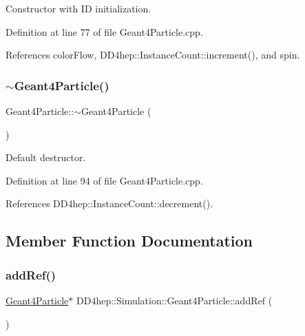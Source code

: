 Constructor with ID initialization. 



Definition at line 77 of file Geant4\+Particle.\+cpp.



References color\+Flow, D\+D4hep\+::\+Instance\+Count\+::increment(), and spin.

\hypertarget{class_d_d4hep_1_1_simulation_1_1_geant4_particle_a6826af4b7518aeb0e2396eb7abaed67c}{}\label{class_d_d4hep_1_1_simulation_1_1_geant4_particle_a6826af4b7518aeb0e2396eb7abaed67c} 
\subsubsection{\texorpdfstring{$\sim$\+Geant4\+Particle()}{~Geant4Particle()}}
{\footnotesize\ttfamily Geant4\+Particle\+::$\sim$\+Geant4\+Particle (\begin{DoxyParamCaption}{ }\end{DoxyParamCaption})\hspace{0.3cm}{\ttfamily [virtual]}}



Default destructor. 



Definition at line 94 of file Geant4\+Particle.\+cpp.



References D\+D4hep\+::\+Instance\+Count\+::decrement().



\subsection{Member Function Documentation}
\hypertarget{class_d_d4hep_1_1_simulation_1_1_geant4_particle_a57fda35759c8768450ef1c7d5509c281}{}\label{class_d_d4hep_1_1_simulation_1_1_geant4_particle_a57fda35759c8768450ef1c7d5509c281} 
\subsubsection{\texorpdfstring{add\+Ref()}{addRef()}}
{\footnotesize\ttfamily \hyperlink{class_d_d4hep_1_1_simulation_1_1_geant4_particle}{Geant4\+Particle}$\ast$ D\+D4hep\+::\+Simulation\+::\+Geant4\+Particle\+::add\+Ref (\begin{DoxyParamCaption}{ }\end{DoxyParamCaption})\hspace{0.3cm}{\ttfamily [inline]}}



